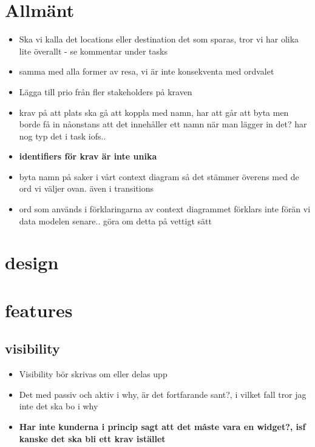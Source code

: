 \documentclass[a4paper]{article}
\begin{document}
	\thispagestyle{empty}
	\setcounter{page}{0}
	\pagebreak
	\tableofcontents
	\pagebreak

\section{Allmänt}
\begin{itemize}

	\item Ska vi kalla det locations eller destination det som sparas, tror vi har olika lite överallt - se kommentar under tasks
	\item samma med alla former av resa, vi är inte konsekventa med ordvalet

	\item Lägga till prio från fler stakeholders på kraven
	\item krav på att plats ska gå att koppla med namn, har att går att byta men borde få in nåonstans att det innehåller ett namn när man lägger in det? har nog typ det i task iofs.. 
	\item \textbf{identifiers för krav är inte unika}
	\item byta namn på saker i vårt context diagram så det stämmer överens med de ord vi väljer ovan. även i transitions
	\item ord som används i förklaringarna av context diagrammet förklars inte förän vi data modelen senare.. göra om detta på vettigt sätt
\end{itemize}

\section{design}

\section{features}
	\subsection{visibility}
		\begin{itemize}
			\item Visibility bör skrivas om eller delas upp
			\item Det med passiv och aktiv i why, är det fortfarande sant?, i vilket fall tror jag inte det ska bo i why
			\item \textbf{Har inte kunderna i princip sagt att det måste vara en widget?, isf kanske det ska bli ett krav istället}

		\end{itemize}
\end{document}
